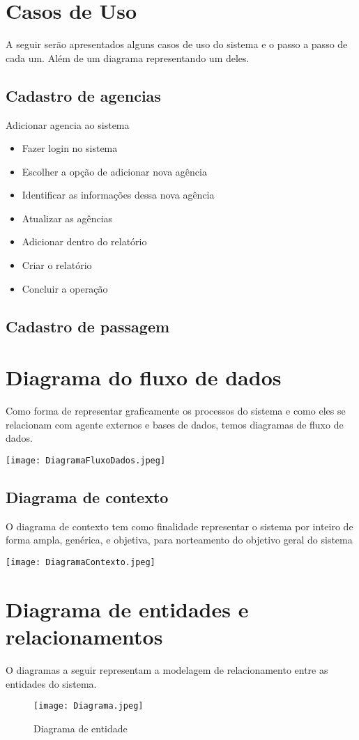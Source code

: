 \section{ Casos de Uso}
A seguir serão apresentados alguns casos de uso do sistema e o passo a passo de cada um. Além de
um diagrama representando um deles.


\subsection{Cadastro de agencias}
Adicionar agencia ao sistema
\begin{itemize}
  \item Fazer login no sistema
  \item Escolher a opção de adicionar nova agência
  \item Identificar as informações dessa nova agência
  \item Atualizar as agências
  \item Adicionar dentro do relatório
  \item Criar o relatório
  \item Concluir a operação
\end{itemize}

\subsection{Cadastro de passagem}


\section{Diagrama do fluxo de dados}
Como forma de representar graficamente os processos do sistema e como eles se relacionam com
agente externos e bases de dados, temos diagramas de fluxo de dados.

\texttt{[image: DiagramaFluxoDados.jpeg]}


\subsection{Diagrama de contexto}
O diagrama de contexto tem como finalidade representar o sistema por inteiro de forma ampla,
genérica, e objetiva, para norteamento do objetivo geral do sistema

\begin{center}
  \texttt{[image: DiagramaContexto.jpeg]}
\end{center}


\section{Diagrama de entidades e relacionamentos}
O diagramas a seguir representam a modelagem de relacionamento entre as entidades do sistema.

\begin{figure}[!ht]
  \caption{Diagrama de entidade}
  \centering
  \texttt{[image: Diagrama.jpeg]}
\end{figure}